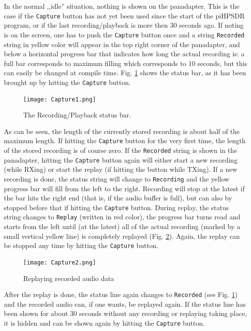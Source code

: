 \documentclass[12pt]{book}
\def\rett#1{\texttt{\color{red}#1}}
\def\bltt#1{\texttt{\color{blue}#1}}
\def\pH{pi\-HPSDR\xspace}
\begin{document}
In the normal ,,idle'' situation, nothing is shown on the panadapter. This is the case if the \bltt{Capture}
button has not yet been used since the start of the \pH program, or if the last recording/playback is
more then 30 seconds ago. If noting is on the screen, one has to push the \bltt{Capture} button once and
a string \rett{Recorded} string in yellow color will appear in the top right corner of the panadapter,
and below a horizontal progress bar that indicates how long the actual recording is: a full bar corresponds
to maximum filling which corresponds to 10 seconds, but this can easily be changed at compile time.
Fig. \ref{fig:capture1} shows the status bar, as it has been brought up by hitting the \bltt{Capture} button.

\begin{figure}[ht]
\center
\texttt{[image: Capture1.png]}
\caption{The Recording/Playback status bar.}
\label{fig:capture1}
\end{figure}

As can be seen, the length of the currently stored recording is about half of the maximum length. If hitting
the \bltt{Capture} button for the very first time, the length of the stored recording is of course zero. If
the \rett{Recorded} string is shown in the panadapter, hitting the \bltt{Capture} button again will either
start a new recording (while RXing) or start the replay (if hitting the button while TXing).
If a new recording is done, the status string will change to \rett{Recording} and the yellow progress bar
will fill from the left to the right. Recording will stop at the latest if the bar hits the right end
(that is, if the audio buffer is full), but can also by stopped before that if hitting the \bltt{Capture}
button. During replay, the status string changes to \rett{Replay} (written in red color), the progress bar
turns read and starts from the left until (at the latest) all of the actual recording (marked by a small
vertical yellow line) is completely replayed (Fig. \ref{fig:capture2}). Again, the replay can be stopped any time by hitting
the \bltt{Capture} button.
\begin{figure}[ht]
\center
\texttt{[image: Capture2.png]}
\caption{Replaying recorded audio data}
\label{fig:capture2}
\end{figure}

After the replay is done, the status line again changes to \rett{Recorded} (see Fig. \ref{fig:capture1})
and the recorded audio can, if one wants, be replayed again. If the status line has been shown for about
30 seconds without any recording or replaying taking place, it is hidden and can be shown again by
hitting the \bltt{Capture} button.
\end{document}
